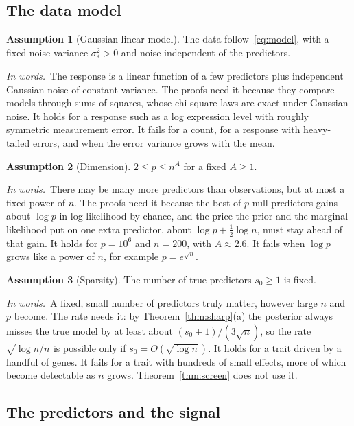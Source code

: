 \documentclass[11pt]{article}
\newcommand{\sigs}{\sigma_*}
\newcommand{\sz}{s_0}
\newcommand{\rn}{\sqrt{\log n/n}}
\theoremstyle{plain}
\theoremstyle{definition}
\newtheorem{asm}{Assumption}
\newcommand{\words}{\par\smallskip\noindent\textit{In words.}\ }
\begin{document}
\subsection*{The data model}

\begin{asm}[Gaussian linear model]\label{a:gl}
The data follow~\eqref{eq:model}, with a fixed noise variance $\sigs^2>0$ and noise independent of the predictors.
\end{asm}
\words The response is a linear function of a few predictors plus independent Gaussian noise of constant variance.
The proofs need it because they compare models through sums of squares, whose chi-square laws are exact under Gaussian
noise. It holds for a response such as a log expression level with roughly symmetric measurement error. It fails for a
count, for a response with heavy-tailed errors, and when the error variance grows with the mean.

\begin{asm}[Dimension]\label{a:dim}
$2\le p\le n^A$ for a fixed $A\ge1$.
\end{asm}
\words There may be many more predictors than observations, but at most a fixed power of $n$. The proofs need it
because the best of $p$ null predictors gains about $\log p$ in log-likelihood by chance, and the price the prior and
the marginal likelihood put on one extra predictor, about $\log p+\tfrac12\log n$, must stay ahead of that gain. It holds
for $p=10^6$ and $n=200$, with $A\approx2.6$. It fails when $\log p$ grows like a power of $n$, for example
$p=e^{\sqrt n}$.

\begin{asm}[Sparsity]\label{a:sp}
The number of true predictors $\sz\ge1$ is fixed.
\end{asm}
\words A fixed, small number of predictors truly matter, however large $n$ and $p$ become. The rate needs it: by
Theorem~\ref{thm:sharp}(a) the posterior always misses the true model by at least about $(\sz+1)/(3\sqrt n)$, so the
rate $\rn$ is possible only if $\sz=O(\sqrt{\log n})$. It holds for a trait driven by a handful of genes. It fails for
a trait with hundreds of small effects, more of which become detectable as $n$ grows. Theorem~\ref{thm:screen} does
not use it.

\subsection*{The predictors and the signal}
\end{document}
